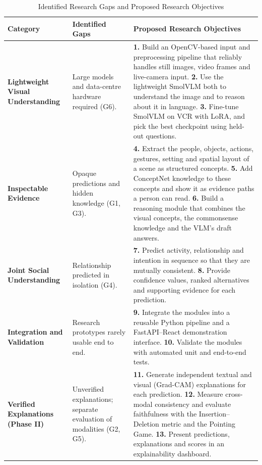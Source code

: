 \begin{table}[h!]
\centering
\caption{{Identified Research Gaps and Proposed Research Objectives}}
\label{tab:research_gaps_objectives}
\renewcommand{\arraystretch}{1.4}
\setlength{\tabcolsep}{4pt}
\small
\begin{tabularx}{\textwidth}{|p{3.4cm}|p{4.4cm}|L|}
\hline
\textbf{Category} & \textbf{Identified Gaps} & \textbf{Proposed Research Objectives} \\ \hline

\textbf{Lightweight Visual Understanding} &
Large models and data-centre hardware required (G6). &
\textbf{1.} Build an OpenCV-based input and preprocessing pipeline that reliably handles still images, video frames and live-camera input.
\newline \textbf{2.} Use the lightweight SmolVLM both to understand the image and to reason about it in language.
\newline \textbf{3.} Fine-tune SmolVLM on VCR with LoRA, and pick the best checkpoint using held-out questions. \\ \hline

\textbf{Inspectable Evidence} &
Opaque predictions and hidden knowledge (G1, G3). &
\textbf{4.} Extract the people, objects, actions, gestures, setting and spatial layout of a scene as structured concepts.
\newline \textbf{5.} Add ConceptNet knowledge to these concepts and show it as evidence paths a person can read.
\newline \textbf{6.} Build a reasoning module that combines the visual concepts, the commonsense knowledge and the VLM's draft answers. \\ \hline

\textbf{Joint Social Understanding} &
Relationship predicted in isolation (G4). &
\textbf{7.} Predict activity, relationship and intention in sequence so that they are mutually consistent.
\newline \textbf{8.} Provide confidence values, ranked alternatives and supporting evidence for each prediction. \\ \hline

\textbf{Integration and Validation} &
Research prototypes rarely usable end to end. &
\textbf{9.} Integrate the modules into a reusable Python pipeline and a FastAPI--React demonstration interface.
\newline \textbf{10.} Validate the modules with automated unit and end-to-end tests. \\ \hline

\textbf{Verified Explanations (Phase II)} &
Unverified explanations; separate evaluation of modalities (G2, G5). &
\textbf{11.} Generate independent textual and visual (Grad-CAM) explanations for each prediction.
\newline \textbf{12.} Measure cross-modal consistency and evaluate faithfulness with the Insertion--Deletion metric and the Pointing Game.
\newline \textbf{13.} Present predictions, explanations and scores in an explainability dashboard. \\ \hline
\end{tabularx}
\end{table}
